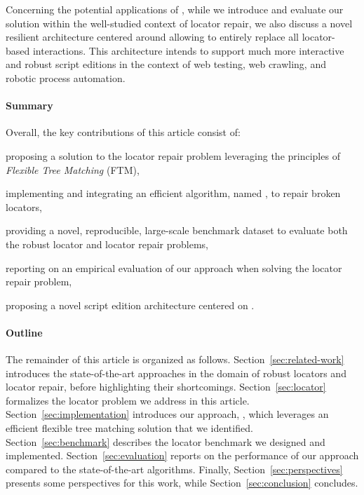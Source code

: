 Concerning the potential applications of \erratum, while we introduce and evaluate our solution within the well-studied context of locator repair, we also discuss a novel resilient architecture centered around \erratum allowing to entirely replace all locator-based interactions.
This architecture intends to support much more interactive and robust script editions in the context of web testing, web crawling, and robotic process automation.

\paragraph{Summary}
Overall, the key contributions of this article consist of:
\begin{compactenum}
    \item proposing a solution to the locator repair problem leveraging the principles of \emph{Flexible Tree Matching} (FTM),
    \item implementing and integrating an efficient algorithm, named \erratum, to repair broken locators,
    \item providing a novel, reproducible, large-scale benchmark dataset to evaluate both the robust locator and locator repair problems,
    \item reporting on an empirical evaluation of our approach when solving the locator repair problem,
    \item proposing a novel script edition architecture centered on \erratum.
\end{compactenum}

\paragraph{Outline}
The remainder of this article is organized as follows.
Section~\ref{sec:related-work} introduces the state-of-the-art approaches in the domain of robust locators and locator repair, before highlighting their shortcomings.
Section~\ref{sec:locator} formalizes the locator problem we address in this article.
Section~\ref{sec:implementation} introduces our approach, \erratum, which leverages an efficient flexible tree matching solution that we identified.
Section~\ref{sec:benchmark} describes the locator benchmark we designed and implemented.
Section~\ref{sec:evaluation} reports on the performance of our approach compared to the state-of-the-art algorithms.
Finally, Section~\ref{sec:perspectives} presents some perspectives for this work, while Section~\ref{sec:conclusion} concludes.

